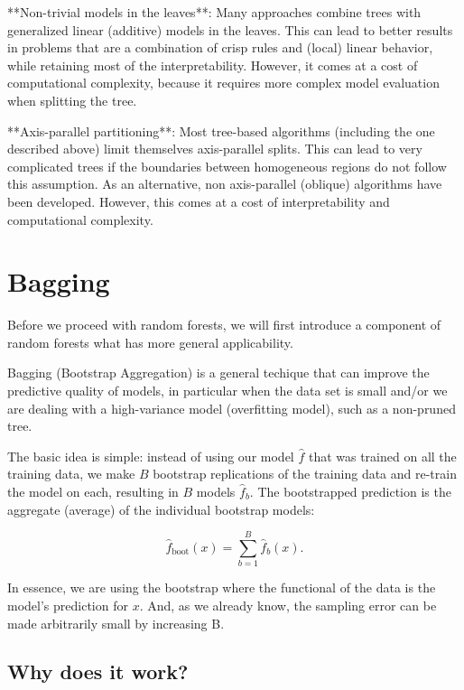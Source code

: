 **Non-trivial models in the leaves**: Many approaches combine trees with generalized linear (additive) models in the leaves. This can lead to better results in problems that are a combination of crisp rules and (local) linear behavior, while retaining most of the interpretability. However, it comes at a cost of computational complexity, because it requires more complex model evaluation when splitting the tree.

**Axis-parallel partitioning**: Most tree-based algorithms (including the one described above) limit themselves axis-parallel splits. This can lead to very complicated trees if the boundaries between homogeneous regions do not follow this assumption. As an alternative, non axis-parallel (oblique) algorithms have been developed. However, this comes at a cost of interpretability and computational complexity.



\section{Bagging}

Before we proceed with random forests, we will first introduce a component of random forests what has more general applicability.

Bagging (Bootstrap Aggregation) is a general techique that can improve the predictive quality of models, in particular when the data set is small and/or we are dealing with a high-variance model (overfitting model), such as a non-pruned tree.

The basic idea is simple: instead of using our model $\hat{f}$ that was trained on all the training data, we make $B$ bootstrap replications of the training data and re-train the model on each, resulting in $B$ models $\hat{f}_b$. The bootstrapped prediction is the aggregate (average) of the individual bootstrap models:

$$\hat{f}_{\text{boot}}(x) = \sum_{b=1}^B \hat{f}_b(x).$$

In essence, we are using the bootstrap where the functional of the data is the model's prediction for $x$. And, as we already know, the sampling error can be made arbitrarily small by increasing B.

\subsection*{Why does it work?}



